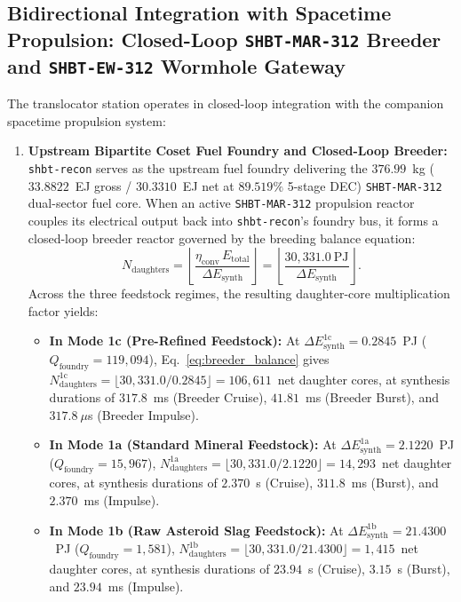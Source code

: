\documentclass[11pt,onecolumn]{article}
\begin{document}
\subsection[Bidirectional Integration with \texttt{shbt-warp}]{Bidirectional Integration with Spacetime Propulsion: Closed-Loop \texttt{SHBT-MAR-312} Breeder and \texttt{SHBT-EW-312} Wormhole Gateway}
\label{subsec:warp_integration}
The translocator station operates in closed-loop integration with the companion spacetime propulsion system:
\begin{enumerate}
    \item \textbf{Upstream Bipartite Coset Fuel Foundry and Closed-Loop Breeder:}
    \texttt{shbt-recon} serves as the upstream fuel foundry delivering the $376.99$~kg ($33.8822$~EJ gross / $30.3310$~EJ net at $89.519\%$ 5-stage DEC) \texttt{SHBT-MAR-312} dual-sector fuel core. When an active \texttt{SHBT-MAR-312} propulsion reactor couples its electrical output back into \texttt{shbt-recon}'s foundry bus, it forms a closed-loop breeder reactor governed by the breeding balance equation:
    \begin{equation}
    N_{\text{daughters}} = \left\lfloor \frac{\eta_{\text{conv}}\,E_{\text{total}}}{\Delta E_{\text{synth}}} \right\rfloor = \left\lfloor \frac{30{,}331.0~\text{PJ}}{\Delta E_{\text{synth}}} \right\rfloor.
    \label{eq:breeder_balance}
    \end{equation}
    Across the three feedstock regimes, the resulting daughter-core multiplication factor yields:
    \begin{itemize}
        \item \textbf{In Mode 1c (Pre-Refined Feedstock):} At $\Delta E_{\text{synth}}^{\text{1c}} = 0.2845$~PJ ($Q_{\text{foundry}} = 119{,}094$), Eq.~\eqref{eq:breeder_balance} gives $N_{\text{daughters}}^{\text{1c}} = \lfloor 30{,}331.0 / 0.2845 \rfloor = 106{,}611$~net daughter cores, at synthesis durations of $317.8$~ms (Breeder Cruise), $41.81$~ms (Breeder Burst), and $317.8~\mu$s (Breeder Impulse).
        \item \textbf{In Mode 1a (Standard Mineral Feedstock):} At $\Delta E_{\text{synth}}^{\text{1a}} = 2.1220$~PJ ($Q_{\text{foundry}} = 15{,}967$), $N_{\text{daughters}}^{\text{1a}} = \lfloor 30{,}331.0 / 2.1220 \rfloor = 14{,}293$~net daughter cores, at synthesis durations of $2.370$~s (Cruise), $311.8$~ms (Burst), and $2.370$~ms (Impulse).
        \item \textbf{In Mode 1b (Raw Asteroid Slag Feedstock):} At $\Delta E_{\text{synth}}^{\text{1b}} = 21.4300$~PJ ($Q_{\text{foundry}} = 1{,}581$), $N_{\text{daughters}}^{\text{1b}} = \lfloor 30{,}331.0 / 21.4300 \rfloor = 1{,}415$~net daughter cores, at synthesis durations of $23.94$~s (Cruise), $3.15$~s (Burst), and $23.94$~ms (Impulse).
    \end{itemize}


\end{enumerate}
\end{document}
